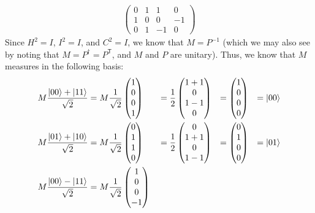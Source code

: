 \documentclass[12pt]{amsart}
\begin{document}
\begin{enumerate}
\begin{align*}
\begin{pmatrix}
           0 & 1 &  1 &  0 \\
           1 & 0 &  0 & -1 \\
           0 & 1 & -1 &  0
         \end{pmatrix}
    \end{align*}
    Since $H^2 = I$, $I^2 = I$, and $C^2 = I$, we know that $M = P^{-1}$ (which
    we may also see by noting that $M = P^\dag = P^{\mathsf{T}}$, and $M$ and
    $P$ are unitary).  Thus, we know that $M$ measures in the following basis:
    \begin{alignat*}{4}
      M\frac{\ket{00} + \ket{11}}{\sqrt{2}}
        &= M\frac{1}{\sqrt{2}}\begin{pmatrix} 1 \\ 0 \\ 0 \\ 1 \end{pmatrix}
       &&= \frac{1}{2}\begin{pmatrix} 1+1 \\ 0 \\ 1-1 \\ 0 \end{pmatrix}
        &= \begin{pmatrix} 1 \\ 0 \\ 0 \\ 0 \end{pmatrix}
       &&= \ket{00} \\
      M\frac{\ket{01} + \ket{10}}{\sqrt{2}}
        &= M\frac{1}{\sqrt{2}}\begin{pmatrix} 0 \\ 1 \\ 1 \\ 0 \end{pmatrix}
       &&= \frac{1}{2}\begin{pmatrix} 0 \\ 1+1 \\ 0 \\ 1-1 \end{pmatrix}
        &= \begin{pmatrix} 0 \\ 1 \\ 0 \\ 0 \end{pmatrix}
       &&= \ket{01} \\
      M\frac{\ket{00} - \ket{11}}{\sqrt{2}}
        &= M\frac{1}{\sqrt{2}}\begin{pmatrix} 1 \\ 0 \\ 0 \\ -1 \end{pmatrix}

\end{alignat*}
\end{enumerate}
\end{document}
